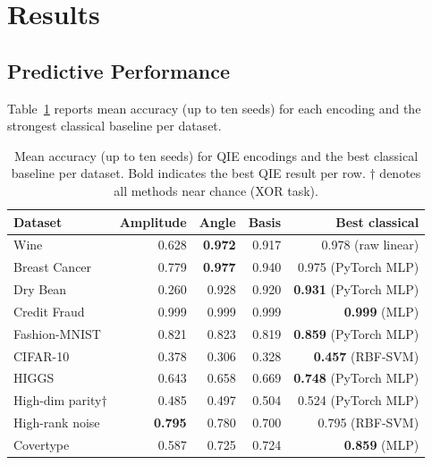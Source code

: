 \section{Results}
\label{sec:results}

\subsection{Predictive Performance}
\label{sec:perf}

Table~\ref{tab:accuracy} reports mean accuracy (up to ten seeds) for each
encoding and the strongest classical baseline per dataset.

\begin{table}[tbp]
\centering
\caption{Mean accuracy (up to ten seeds) for QIE encodings and the best classical
baseline per dataset.  Bold indicates the best QIE result per row.
$\dagger$ denotes all methods near chance (XOR task).}
\label{tab:accuracy}
\small
\begin{tabular}{lrrrr}
\toprule
Dataset & Amplitude & Angle & Basis & Best classical \\
\midrule
Wine                     & 0.628 & \textbf{0.972} & 0.917 & 0.978 (raw linear) \\
Breast Cancer            & 0.779 & \textbf{0.977} & 0.940 & 0.975 (PyTorch MLP) \\
Dry Bean                 & 0.260 & 0.928          & 0.920 & \textbf{0.931} (PyTorch MLP) \\
Credit Fraud             & 0.999 & 0.999          & 0.999 & \textbf{0.999} (MLP) \\
Fashion-MNIST            & 0.821 & 0.823          & 0.819 & \textbf{0.859} (PyTorch MLP) \\
CIFAR-10                 & 0.378 & 0.306          & 0.328 & \textbf{0.457} (RBF-SVM) \\
HIGGS                    & 0.643 & 0.658          & 0.669 & \textbf{0.748} (PyTorch MLP) \\
High-dim parity$\dagger$ & 0.485 & 0.497          & 0.504 & 0.524 (PyTorch MLP) \\
High-rank noise          & \textbf{0.795} & 0.780  & 0.700 & 0.795 (RBF-SVM) \\
Covertype                & 0.587 & 0.725          & 0.724 & \textbf{0.859} (MLP) \\
\bottomrule
\end{tabular}
\end{table}

